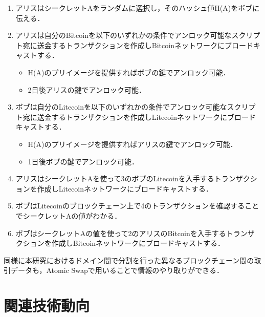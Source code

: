 \documentclass[a4paper,12pt]{jsarticle}
\begin{document}
\begin{enumerate}
  \item アリスはシークレットAをランダムに選択し，そのハッシュ値H(A)をボブに伝える．
  \item アリスは自分のBitcoinを以下のいずれかの条件でアンロック可能なスクリプト宛に送金するトランザクションを作成しBitcoinネットワークにブロードキャストする．
%
  \begin{itemize}
    \item H(A)のプリイメージを提供すればボブの鍵でアンロック可能．
    \item 2日後アリスの鍵でアンロック可能．
  \end{itemize} 
  \item ボブは自分のLitecoinを以下のいずれかの条件でアンロック可能なスクリプト宛に送金するトランザクションを作成しLitecoinネットワークにブロードキャストする．
%
  \begin{itemize}
    \item H(A)のプリイメージを提供すればアリスの鍵でアンロック可能．
    \item 1日後ボブの鍵でアンロック可能．
  \end{itemize}
%
  \item アリスはシークレットAを使って3のボブのLitecoinを入手するトランザクションを作成しLitecoinネットワークにブロードキャストする．
  \item ボブはLitecoinのブロックチェーン上で4のトランザクションを確認することでシークレットAの値がわかる．
  \item ボブはシークレットAの値を使って2のアリスのBitcoinを入手するトランザクションを作成しBitcoinネットワークにブロードキャストする．
\end{enumerate}

同様に本研究におけるドメイン間で分割を行った異なるブロックチェーン間の取引データも，Atomic Swapで用いることで情報のやり取りができる．

%
\newpage
%
\section{関連技術動向}
\end{document}
